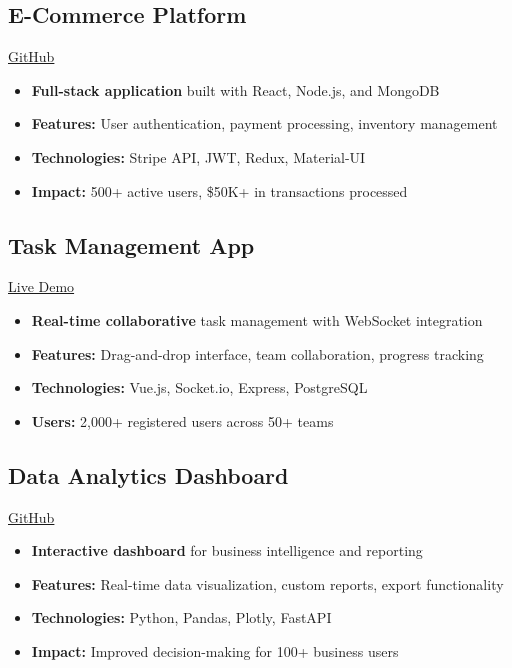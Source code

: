 \documentclass[11pt,a4paper]{article}
\begin{document}
\subsection{E-Commerce Platform} \hfill \href{https://github.com/yourusername/ecommerce}{GitHub}
\begin{itemize}
\item \textbf{Full-stack application} built with React, Node.js, and MongoDB
\item \textbf{Features:} User authentication, payment processing, inventory management
\item \textbf{Technologies:} Stripe API, JWT, Redux, Material-UI
\item \textbf{Impact:} 500+ active users, \$50K+ in transactions processed
\end{itemize}

\subsection{Task Management App} \hfill \href{https://your-task-app.vercel.app}{Live Demo}
\begin{itemize}
\item \textbf{Real-time collaborative} task management with WebSocket integration
\item \textbf{Features:} Drag-and-drop interface, team collaboration, progress tracking
\item \textbf{Technologies:} Vue.js, Socket.io, Express, PostgreSQL
\item \textbf{Users:} 2,000+ registered users across 50+ teams
\end{itemize}

\subsection{Data Analytics Dashboard} \hfill \href{https://github.com/yourusername/analytics}{GitHub}
\begin{itemize}
\item \textbf{Interactive dashboard} for business intelligence and reporting
\item \textbf{Features:} Real-time data visualization, custom reports, export functionality
\item \textbf{Technologies:} Python, Pandas, Plotly, FastAPI
\item \textbf{Impact:} Improved decision-making for 100+ business users
\end{itemize}
\end{document}
